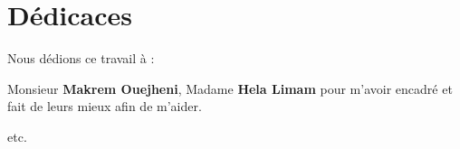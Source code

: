 \chapter*{\Huge Dédicaces}

\begingroup
    \large \raggedright Nous dédions ce travail à :
    \vspace{4mm}
    
    		Monsieur \textbf{Makrem Ouejheni}, Madame \textbf{Hela Limam} pour m'avoir encadré et fait de leurs mieux afin de m'aider.
    
    \vspace{4mm}
    etc.
\endgroup

\vspace{8mm}
\begin{flushright}
    \LARGE \@author
\end{flushright}